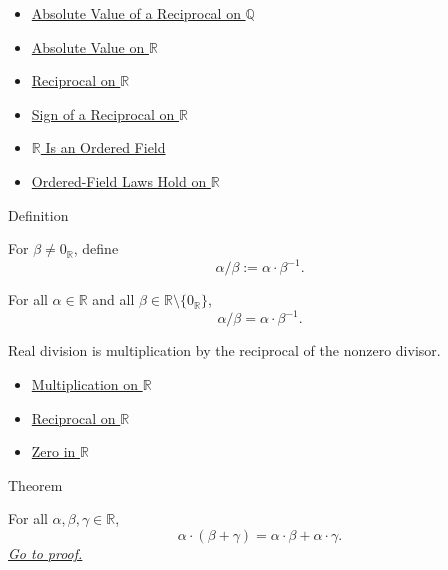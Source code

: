 \begin{dependencies}
\begin{itemize}
  \item \hyperref[thm:absolute-value-of-reciprocal-q]{Absolute Value of a Reciprocal on $\mathbb{Q}$}
  \item \hyperref[def:real-chapter-absolute-value-on-r]{Absolute Value on $\mathbb{R}$}
  \item \hyperref[def:reciprocal-on-r]{Reciprocal on $\mathbb{R}$}
  \item \hyperref[thm:sign-of-reciprocal-r]{Sign of a Reciprocal on $\mathbb{R}$}
  \item \hyperref[thm:r-is-an-ordered-field]{$\mathbb{R}$ Is an Ordered Field}
  \item \hyperref[cor:ordered-field-laws-on-r]{Ordered-Field Laws Hold on $\mathbb{R}$}
\end{itemize}
\end{dependencies}

\begin{definitionbox}{Definition}
\begin{definition}
\label{def:division-on-r}
For $\beta\ne0_{\mathbb{R}}$, define
\[
\alpha/\beta:=\alpha\cdot\beta^{-1}.
\]
\end{definition}
\end{definitionbox}

\begin{remark*}
For all $\alpha\in\mathbb{R}$ and all
$\beta\in\mathbb{R}\setminus\{0_{\mathbb{R}}\}$,
\[
\alpha/\beta=\alpha\cdot\beta^{-1}.
\]
\end{remark*}

\begin{remark*}[Interpretation]
Real division is multiplication by the reciprocal of the nonzero divisor.
\end{remark*}

\begin{dependencies}
\begin{itemize}
  \item \hyperref[def:multiplication-on-r]{Multiplication on $\mathbb{R}$}
  \item \hyperref[def:reciprocal-on-r]{Reciprocal on $\mathbb{R}$}
  \item \hyperref[def:zero-in-r]{Zero in $\mathbb{R}$}
\end{itemize}
\end{dependencies}

\begin{theorembox}{Theorem}
\begin{theorem}
\label{thm:distributivity-on-r}
For all $\alpha,\beta,\gamma\in\mathbb{R}$,
\[
\alpha\cdot(\beta+\gamma)=\alpha\cdot\beta+\alpha\cdot\gamma.
\]
\hyperref[prf:distributivity-on-r]{\textit{Go to proof.}}
\end{theorem}
\end{theorembox}

